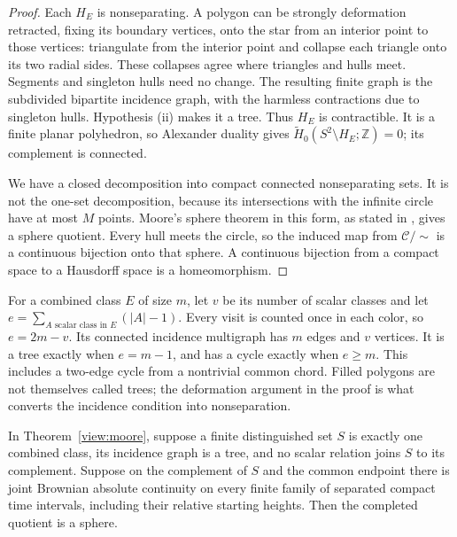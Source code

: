 \begin{proof}
Each $H_E$ is nonseparating.  A polygon can be strongly deformation
retracted, fixing its boundary vertices, onto the star from an interior
point to those vertices: triangulate from the interior point and collapse
each triangle onto its two radial sides.  These collapses agree where
triangles and hulls meet.  Segments and singleton hulls need no change.
The resulting finite graph is the subdivided bipartite incidence graph,
with the harmless contractions due to singleton hulls.  Hypothesis (ii)
makes it a tree.  Thus $H_E$ is contractible.  It is a finite planar
polyhedron, so Alexander duality gives
$\widetilde H_0(S^2\setminus H_E;\mathbb Z)=0$; its complement is connected.

We have a closed decomposition into compact connected nonseparating sets.
It is not the one-set decomposition, because its intersections with the
infinite circle have at most $M$ points.  Moore's sphere theorem in this
form, as stated in \cite[Theorem 1.1]{TimorinMoore}, gives a sphere quotient.
Every hull meets the circle, so the induced map from $\mathcal C/\sim$ is
a continuous bijection onto that sphere.  A continuous bijection from a
compact space to a Hausdorff space is a homeomorphism.
\end{proof}

\begin{remark}\label{view:rank-tree}
For a combined class $E$ of size $m$, let $v$ be its number of scalar
classes and let
$e=\sum_{A\text{ scalar class in }E}(|A|-1)$.  Every visit is counted once
in each color, so $e=2m-v$.  Its connected incidence multigraph has $m$
edges and $v$ vertices.  It is a tree exactly when $e=m-1$, and has a cycle
exactly when $e\ge m$.  This includes a two-edge cycle from a nontrivial
common chord.  Filled polygons are not themselves called trees; the
deformation argument in the proof is what converts the incidence condition
into nonseparation.
\end{remark}

\begin{corollary}\label{view:one-class}
In Theorem~\ref{view:moore}, suppose a finite distinguished set $S$ is
exactly one combined class, its incidence graph is a tree, and no scalar
relation joins $S$ to its complement.  Suppose on the complement of $S$
and the common endpoint there is joint Brownian absolute continuity on
every finite family of separated compact time intervals, including their
relative starting heights.  Then the completed quotient is a sphere.
\end{corollary}

